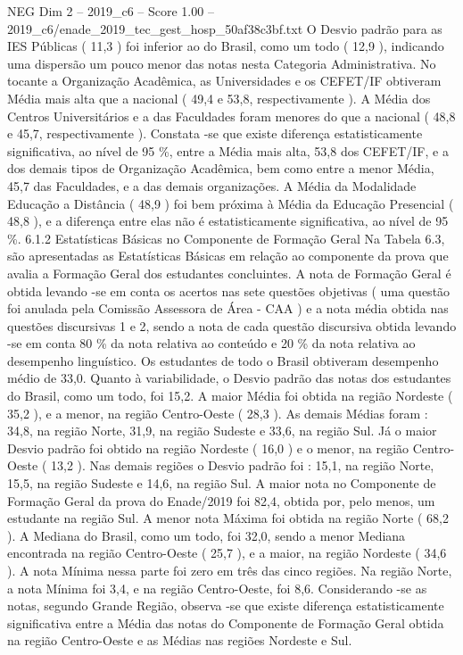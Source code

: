 \begin{textsample}{NEG Dim 2 – 2019\_c6 – Score 1.00 – 2019\_c6/enade\_2019\_tec\_gest\_hosp\_50af38c3bf.txt}
O Desvio padrão para as IES Públicas ( 11,3 ) foi inferior ao do Brasil, como um todo ( 12,9 ), indicando uma dispersão um pouco menor das notas nesta Categoria Administrativa.
No tocante a Organização Acadêmica, as Universidades e os CEFET/IF obtiveram Média mais alta que a nacional ( 49,4 e 53,8, respectivamente ).
A Média dos Centros Universitários e a das Faculdades foram menores do que a nacional ( 48,8 e 45,7, respectivamente ).
Constata -se que existe diferença estatisticamente significativa, ao nível de 95 \%, entre a Média mais alta, 53,8 dos CEFET/IF, e a dos demais tipos de Organização Acadêmica, bem como entre a menor Média, 45,7 das Faculdades, e a das demais organizações.
A Média da Modalidade Educação a Distância ( 48,9 ) foi bem próxima à Média da Educação Presencial ( 48,8 ), e a diferença entre elas não é estatisticamente significativa, ao nível de 95 \%. 6.1.2 Estatísticas Básicas no Componente de Formação Geral Na Tabela 6.3, são apresentadas as Estatísticas Básicas em relação ao componente da prova que avalia a Formação Geral dos estudantes concluintes.
A nota de Formação Geral é obtida levando -se em conta os acertos nas sete questões objetivas ( uma questão foi anulada pela Comissão Assessora de Área - CAA ) e a nota média obtida nas questões discursivas 1 e 2, sendo a nota de cada questão discursiva obtida levando -se em conta 80 \% da nota relativa ao conteúdo e 20 \% da nota relativa ao desempenho linguístico.
Os estudantes de todo o Brasil obtiveram desempenho médio de 33,0.
Quanto à variabilidade, o Desvio padrão das notas dos estudantes do Brasil, como um todo, foi 15,2.
A maior Média foi obtida na região Nordeste ( 35,2 ), e a menor, na região Centro-Oeste ( 28,3 ).
As demais Médias foram : 34,8, na região Norte, 31,9, na região Sudeste e 33,6, na região Sul.
Já o maior Desvio padrão foi obtido na região Nordeste ( 16,0 ) e o menor, na região Centro-Oeste ( 13,2 ).
Nas demais regiões o Desvio padrão foi : 15,1, na região Norte, 15,5, na região Sudeste e 14,6, na região Sul.
A maior nota no Componente de Formação Geral da prova do Enade/2019 foi 82,4, obtida por, pelo menos, um estudante na região Sul.
A menor nota Máxima foi obtida na região Norte ( 68,2 ).
A Mediana do Brasil, como um todo, foi 32,0, sendo a menor Mediana encontrada na região Centro-Oeste ( 25,7 ), e a maior, na região Nordeste ( 34,6 ).
A nota Mínima nessa parte foi zero em três das cinco regiões.
Na região Norte, a nota Mínima foi 3,4, e na região Centro-Oeste, foi 8,6.
Considerando -se as notas, segundo Grande Região, observa -se que existe diferença estatisticamente significativa entre a Média das notas do Componente de Formação Geral obtida na região Centro-Oeste e as Médias nas regiões Nordeste e Sul.

\end{textsample}
